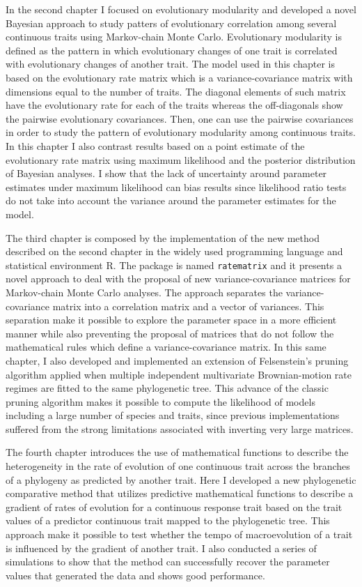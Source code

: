 In the second chapter I focused on evolutionary modularity and developed a novel Bayesian approach to study patters of evolutionary correlation among several continuous traits using Markov-chain Monte Carlo. Evolutionary modularity is defined as the pattern in which evolutionary changes of one trait is correlated with evolutionary changes of another trait. The model used in this chapter is based on the evolutionary rate matrix which is a variance-covariance matrix with dimensions equal to the number of traits. The diagonal elements of such matrix have the evolutionary rate for each of the traits whereas the off-diagonals show the pairwise evolutionary covariances. Then, one can use the pairwise covariances in order to study the pattern of evolutionary modularity among continuous traits. In this chapter I also contrast results based on a point estimate of the evolutionary rate matrix using maximum likelihood and the posterior distribution of Bayesian analyses. I show that the lack of uncertainty around parameter estimates under maximum likelihood can bias results since likelihood ratio tests do not take into account the variance around the parameter estimates for the model.

The third chapter is composed by the implementation of the new method described on the second chapter in the widely used programming language and statistical environment R. The package is named \texttt{ratematrix} and it presents a novel approach to deal with the proposal of new variance-covariance matrices for Markov-chain Monte Carlo analyses. The approach separates the variance-covariance matrix into a correlation matrix and a vector of variances. This separation make it possible to explore the parameter space in a more efficient manner while also preventing the proposal of matrices that do not follow the mathematical rules which define a variance-covariance matrix. In this same chapter, I also developed and implemented an extension of Felsenstein's pruning algorithm applied when multiple independent multivariate Brownian-motion rate regimes are fitted to the same phylogenetic tree. This advance of the classic pruning algorithm makes it possible to compute the likelihood of models including a large number of species and traits, since previous implementations suffered from the strong limitations associated with inverting very large matrices.

The fourth chapter introduces the use of mathematical functions to describe the heterogeneity in the rate of evolution of one continuous trait across the branches of a phylogeny as predicted by another trait. Here I developed a new phylogenetic comparative method that utilizes predictive mathematical functions to describe a gradient of rates of evolution for a continuous response trait based on the trait values of a predictor continuous trait mapped to the phylogenetic tree. This approach make it possible to test whether the tempo of macroevolution of a trait is influenced by the gradient of another trait. I also conducted a series of simulations to show that the method can successfully recover the parameter values that generated the data and shows good performance.

